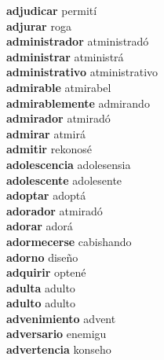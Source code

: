 \textbf{adjudicar } permití \\
\textbf{adjurar } roga \\
\textbf{administrador } atministradó \\
\textbf{administrar } atministrá \\
\textbf{administrativo } atministrativo \\
\textbf{admirable } atmirabel \\
\textbf{admirablemente } admirando \\
\textbf{admirador } atmiradó \\
\textbf{admirar } atmirá \\
\textbf{admitir } rekonosé \\
\textbf{adolescencia } adolesensia \\
\textbf{adolescente } adolesente \\
\textbf{adoptar } adoptá \\
\textbf{adorador } atmiradó \\
\textbf{adorar } adorá \\
\textbf{adormecerse } cabishando \\
\textbf{adorno } diseño \\
\textbf{adquirir } optené \\
\textbf{adulta } adulto \\
\textbf{adulto } adulto \\
\textbf{advenimiento } advent \\
\textbf{adversario } enemigu \\
\textbf{advertencia } konseho \\
